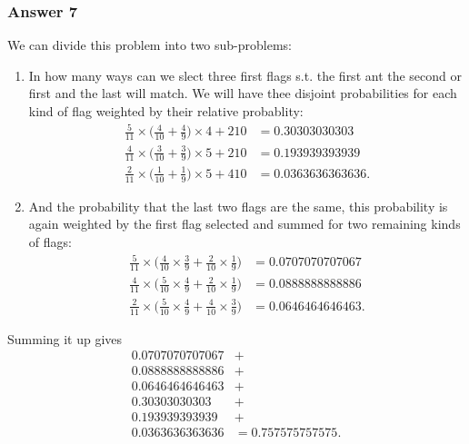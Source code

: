 \documentclass[11pt]{article}
\begin{document}
\subsubsection{Answer 7}
\label{sec-1-2-4}
We can divide this problem into two sub-problems:
\begin{enumerate}
\item In how many ways can we slect three first flags s.t. the first
ant the second or first and the last will match.  We will have
thee disjoint probabilities for each kind of flag weighted by
their relative probablity:
\begin{equation*}
  \begin{aligned}
    \frac{5}{11} \times \Big(\frac{4}{10} + \frac{4}{9}\Big)
    \times{4 + 2}{10}  &= \num{0.30303030303} \\
    \frac{4}{11} \times \Big(\frac{3}{10} + \frac{3}{9}\Big)
    \times {5 + 2}{10} &= \num{0.193939393939} \\
    \frac{2}{11} \times \Big(\frac{1}{10} + \frac{1}{9}\Big)
    \times {5 + 4}{10} &= \num{0.0363636363636}.
  \end{aligned}
\end{equation*}

\item And the probability that the last two flags are the same, this
probability is again weighted by the first flag selected and
summed for two remaining kinds of flags:
\begin{equation*}
  \begin{aligned}
    \frac{5}{11} \times \Big(\frac{4}{10} \times \frac{3}{9} +
    \frac{2}{10} \times \frac{1}{9}\Big) &= \num{0.0707070707067} \\
    \frac{4}{11} \times \Big(\frac{5}{10} \times \frac{4}{9} +
    \frac{2}{10} \times \frac{1}{9}\Big) &= \num{0.0888888888886} \\
    \frac{2}{11} \times \Big(\frac{5}{10} \times \frac{4}{9} +
    \frac{4}{10} \times \frac{3}{9}\Big) &= \num{0.0646464646463}.
  \end{aligned}
\end{equation*}
\end{enumerate}

Summing it up gives 
\begin{equation*}
  \begin{aligned}
    \num{0.0707070707067} &+ \\
    \num{0.0888888888886} &+ \\
    \num{0.0646464646463} &+ \\
    \num{0.30303030303}   &+ \\
    \num{0.193939393939}  &+ \\
    \num{0.0363636363636} &= \num{0.757575757575}.
  \end{aligned}
\end{equation*}
\end{document}

